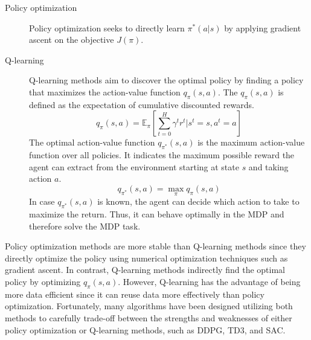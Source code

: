 \begin{description}
  \item[Policy optimization]
        Policy optimization seeks to directly learn $\pi^*(a|s)$ by applying gradient ascent on the objective $J(\pi)$.
  \item[Q-learning]
        Q-learning methods aim to discover the optimal policy by finding a policy that maximizes the action-value function $q_\pi(s,a)$.
        The $q_\pi(s,a)$ is defined as the expectation of cumulative discounted rewards.
        \[
          q_\pi(s,a) = \mathbb{E}_\pi [\sum^H_{t=0} \gamma^t r^t | s^t=s,a^t = a]
        \]
        The optimal action-value function $q_{\pi^*}(s,a)$ is the maximum action-value function over all policies.
        It indicates the maximum possible reward the agent can extract from the environment starting at state $s$ and taking action $a$.
        \[q_{\pi^*}(s,a)=\max_\pi q_\pi(s,a)\]
        In case $q_{\pi^*}(s,a)$ is known,
        the agent can decide which action to take to maximize the return.
        Thus,
        it can behave optimally in the MDP and therefore solve the MDP task.
\end{description}

Policy optimization methods are more stable than Q-learning methods since they directly optimize the policy using numerical optimization techniques such as gradient ascent.
In contrast,
Q-learning methods indirectly find the optimal policy by optimizing $q_\pi(s,a)$.
However,
Q-learning has the advantage of being more data efficient since it can reuse data more effectively than policy optimization.
Fortunately,
many algorithms have been designed utilizing both methods to carefully trade-off between the strengths and weaknesses of either policy optimization or Q-learning methods,
such as DDPG,
TD3,
and SAC.
